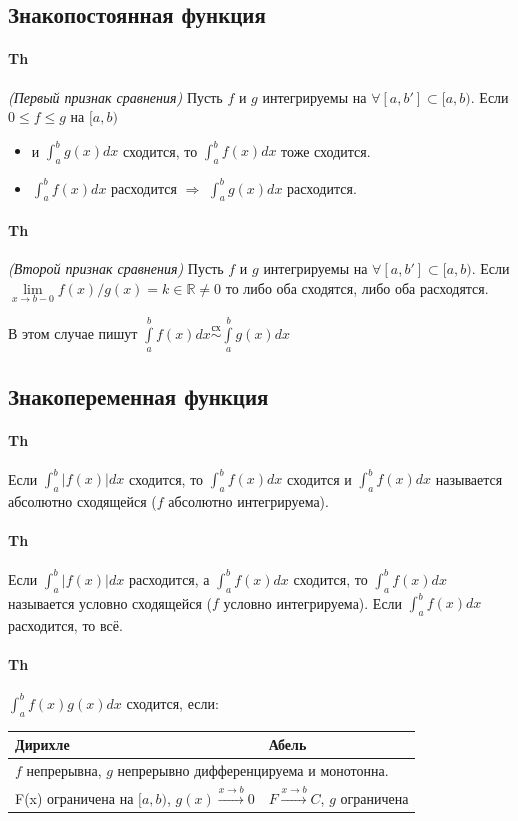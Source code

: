 \documentclass{article}
\newcommand{\R}{\mathbb{R}}
\newcommand{\x}{\text}
\begin{document}
\subsection{Знакопостоянная функция}
\paragraph*{Th} \textit{(Первый признак сравнения)} Пусть $f$ и $g$ интегрируемы на $\forall [a,b']\subset [a,b)$. Если $0 \leq f\leq g$ на $ [a,b) $
\begin{itemize}
    \item и $\int_a^b g(x)dx $ сходится, то $\int_a^b f(x)dx $ тоже сходится.
    \item $\int_a^b f(x)dx $ расходится $\Rightarrow$ $\int_a^b g(x)dx $ расходится.
\end{itemize}


\paragraph*{Th} \textit{(Второй признак сравнения)} Пусть $f$ и $g$ интегрируемы на $\forall [a,b']\subset [a,b)$. Если $ \lim\limits_{x\to b-0}{f(x)}/{g(x)} = k \in \R \neq 0$ то либо оба сходятся, либо оба расходятся.

В этом случае пишут $\int\limits_a^b f(x)dx \mathop{\sim}\limits^{\mathrm{\x{сх}}}\int\limits_a^bg(x) dx$
\subsection{Знакопеременная функция}
\paragraph*{Th} Если $\int_a^b |f(x)|dx$ сходится, то $\int_a^b f(x)dx $ сходится и $\int_a^b f(x)dx $ называется абсолютно сходящейся ($f$ абсолютно интегрируема).
\paragraph*{Th} Если $\int_a^b |f(x)|dx $ расходится, а $\int_a^b f(x)dx $ сходится, то $\int_a^b f(x) dx $ называется условно сходящейся ($f$ условно интегрируема). Если $\int_a^b f(x)dx $ расходится, то всё.
\newpage
\paragraph*{Th} $\int_a^bf(x)g(x)dx$ сходится, если:
\begin{table}[h!]
    \centering
    \begin{tabular}{|ll|}
        \hline
        \multicolumn{1}{|l|}{Дирихле}                                                   & Абель                                      \\ \hline
        \multicolumn{2}{|l|}{$f$ непрерывна, $g$ непрерывно дифференцируема и монотонна.}                                            \\ \hline
        \multicolumn{1}{|l|}{F(x) ограничена на $[a,b)$, $g(x)\xrightarrow{x\to  b} 0$} & $F \xrightarrow{x\to b} C$, $g$ ограничена \\ \hline
    \end{tabular}
\end{table}
\end{document}
